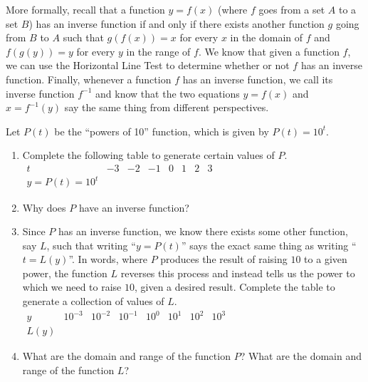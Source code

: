 \documentclass[nooutcomes]{ximera}
\begin{document}
More formally, recall that a function \(y = f(x)\) (where $f$ goes from a set $A$ to a set $B$) has an inverse function if and only if there exists another function $g$ going from $B$ to $A$ such that \(g(f(x)) = x\) for every \(x\) in the domain of \(f\) and \(f(g(y)) = y\) for every $y$ in the range of $f$. We know that given a function \(f\), we can use the Horizontal Line Test to determine whether or not \(f\) has an inverse function.  Finally, whenever a function \(f\) has an inverse function, we call its inverse function \(f^{-1}\) and know that the two equations \(y = f(x)\) and \(x = f^{-1}(y)\) say the same thing from different perspectives.%
\begin{exploration}

Let \(P(t)\) be the ``powers of 10'' function, which is given by \(P(t) = 10^t\).%

\begin{enumerate}[label=\alph*.]
\item
Complete the following table to generate certain values of \(P\).%
\\
$
\begin{array}{l|lllllll}
t&-3&-2&-1&0&1&2&3\\
\hline
y = P(t) = 10^t&~&~&~&~&~&~&
\end{array}
$
\item
Why does \(P\) have an inverse function?%
\item
Since \(P\) has an inverse function, we know there exists some other function, say \(L\), such that writing ``\(y = P(t)\)'' says the exact same thing as writing ``\(t = L(y)\)''.  In words, where \(P\) produces the result of raising \(10\) to a given power, the function \(L\) reverses this process and instead tells us the power to which we need to raise \(10\), given a desired result.  Complete the table to generate a collection of values of \(L\).%
\\
$
\begin{array}{l|lllllll}
y&10^{-3}&10^{-2}&10^{-1}&10^{0}&10^{1}&10^{2}&10^{3}\\
\hline
L(y)&~&~&~&~&~&~&
\end{array}
$
\item
What are the domain and range of the function \(P\)?  What are the domain and range of the function \(L\)?%
\end{enumerate}
%
\end{exploration}


%
%
%
\end{document}
